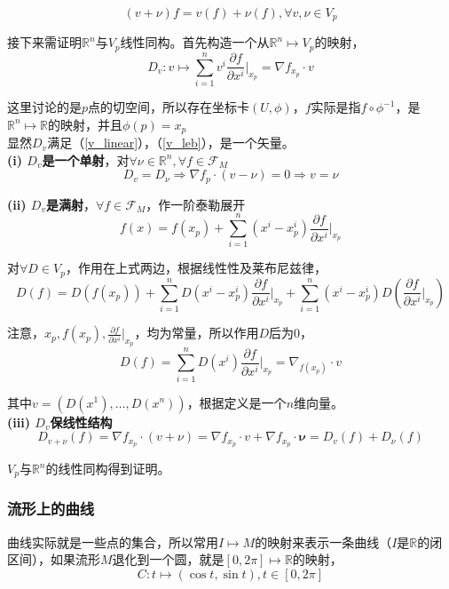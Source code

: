 \documentclass[hpyerref,UTF8,a4paper,titlepage,12pt,oneside]{ctexbook}
\theoremstyle{definition}
\begin{document}
	$$
		(v + \nu )f = v(f) +\nu(f), \forall v,\nu \in V_p 
	$$

	接下来需证明$\mathbb{R}^n$与$V_p$线性同构。首先构造一个从$\mathbb{R}^n\mapsto V_p$的映射，
	$$
		D_v :v \mapsto \sum_{i=1}^nv^i\frac{\partial f}{\partial x^i}\Big|_{x_p} = \nabla f_{x_p} \cdot v
	$$

	这里讨论的是$p$点的切空间，所以存在坐标卡$(U,\phi)$，$f$实际是指$f\circ \phi^{-1}$，是$\mathbb{R}^n \mapsto \mathbb{R}$的映射，并且$\phi(p) = x_p$\\

	显然$D_v$满足（\ref{v_linear}），（\ref{v_leb}），是一个矢量。\\

	 \textbf{(i) $D_v$是一个单射}，对$\forall \nu \in \mathbb{R}^n, \forall f \in \mathscr{F}_M$
	$$
		D_v = D_\nu \Rightarrow \nabla f_p \cdot (v - \nu) = 0 \Rightarrow v = \nu
	$$

	\textbf{(ii) $D_v$是满射}，$\forall f \in \mathscr{F}_M$，作一阶泰勒展开
	$$
		f(x) = f(x_p) + \sum_{i=1}^n(x^i - x_p^i)\frac{\partial{f}}{\partial{x^i}}\Big|_{x_p}
	$$

	对$\forall D \in V_p$，作用在上式两边，根据线性性及莱布尼兹律，
	$$
		D(f) = D(f({x_p})) 
			+ \sum_{i=1}^nD\left(x^i - x_p^i\right)\frac{\partial{f}}{\partial{x^i}}\Big|_{x_p} 
			+ \sum_{i=1}^n(x^i - x_p^i)D\left(\frac{\partial{f}}{\partial{x^i}}\Big|_{x_p}\right)
	$$

	注意，$x_p,f(x_p),\frac{\partial{f}}{{\partial x^i}}|_{x_p}$，均为常量，所以作用$D$后为$0$，
	$$
		D(f) = \sum_{i=1}^nD\left(x^i\right)\frac{\partial{f}}{\partial{x^i}}\Big|_{x_p} = \nabla_{f(x_p)} \cdot v
	$$

	其中$v = (D(x^1),\dots,D(x^n))$，根据定义是一个$n$维向量。\\

	\textbf{(iii) $D_v$保线性结构}
	$$
		D_{v + \nu}(f) = \nabla f_{x_p} \cdot (v + \nu) = \nabla f_{x_p} \cdot v + \nabla f_{x_p} \cdot \mathbf{\nu} = D_v(f) + D_{\nu}(f)
	$$

	$V_p$与$\mathbb{R}^n$的线性同构得到证明。

\subsubsection*{流形上的曲线}
	曲线实际就是一些点的集合，所以常用$I \mapsto M$的映射来表示一条曲线（$I$是$\mathbb{R}$的闭区间），如果流形$M$退化到一个圆，就是$[0,2\pi]\mapsto \mathbb{R}$的映射，
	$$
		C: t \mapsto (\cos t,\sin t), t\in [0,2\pi]
	$$
\end{document}
